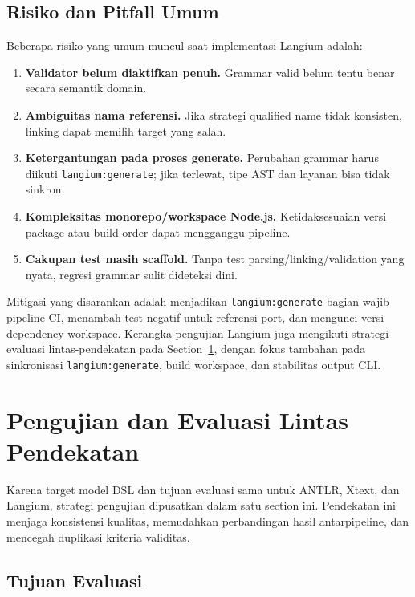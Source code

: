 \subsection{Risiko dan Pitfall Umum}

Beberapa risiko yang umum muncul saat implementasi Langium adalah:
\begin{enumerate}
  \item \textbf{Validator belum diaktifkan penuh.} Grammar valid belum tentu benar secara semantik domain.
  \item \textbf{Ambiguitas nama referensi.} Jika strategi qualified name tidak konsisten, linking dapat memilih target yang salah.
  \item \textbf{Ketergantungan pada proses generate.} Perubahan grammar harus diikuti \texttt{langium:generate}; jika terlewat, tipe AST dan layanan bisa tidak sinkron.
  \item \textbf{Kompleksitas monorepo/workspace Node.js.} Ketidaksesuaian versi package atau build order dapat mengganggu pipeline.
  \item \textbf{Cakupan test masih scaffold.} Tanpa test parsing/linking/validation yang nyata, regresi grammar sulit dideteksi dini.
\end{enumerate}

Mitigasi yang disarankan adalah menjadikan \texttt{langium:generate} bagian wajib pipeline CI, menambah test negatif untuk referensi port, dan mengunci versi dependency workspace.
Kerangka pengujian Langium juga mengikuti strategi evaluasi lintas-pendekatan pada Section~\ref{sec:ch09-pengujian-evaluasi}, dengan fokus tambahan pada sinkronisasi \texttt{langium:generate}, build workspace, dan stabilitas output CLI.

\section{Pengujian dan Evaluasi Lintas Pendekatan}
\label{sec:ch09-pengujian-evaluasi}

Karena target model DSL dan tujuan evaluasi sama untuk ANTLR, Xtext, dan Langium, strategi pengujian dipusatkan dalam satu section ini. Pendekatan ini menjaga konsistensi kualitas, memudahkan perbandingan hasil antarpipeline, dan mencegah duplikasi kriteria validitas.

\subsection{Tujuan Evaluasi}

